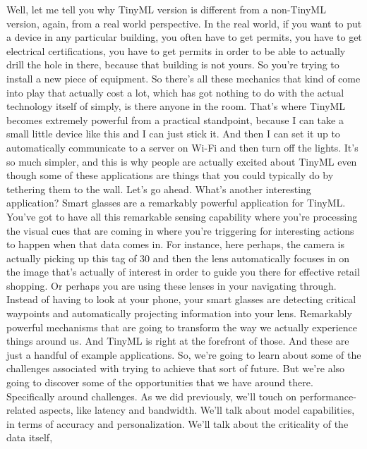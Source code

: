   Well, let me tell you why TinyML version is different from a non-TinyML version,
  again, from a real world perspective.
  In the real world, if you want to put a device in any particular building,
  you often have to get permits, you have to get electrical certifications,
  you have to get permits in order to be able to actually drill
  the hole in there, because that building is not yours.
  So you're trying to install a new piece of equipment.
  So there's all these mechanics that kind of
  come into play that actually cost a lot, which has got nothing
  to do with the actual technology itself of simply, is there anyone in the room.
  That's where TinyML becomes extremely powerful from a practical standpoint,
  because I can take a small little device like this and I can just stick it.
  And then I can set it up to automatically communicate
  to a server on Wi-Fi and then turn off the lights.
  It's so much simpler, and this is why people are actually
  excited about TinyML even though some of these applications
  are things that you could typically do by tethering them to the wall.
  Let's go ahead.
  What's another interesting application?
  Smart glasses are a remarkably powerful application for TinyML.
  You've got to have all this remarkable sensing capability where
  you're processing the visual cues that are coming
  in where you're triggering for interesting actions
  to happen when that data comes in.
  For instance, here perhaps, the camera is actually
  picking up this tag of 30%
  and then the lens automatically focuses in on the image that's
  actually of interest in order to guide you there
  for effective retail shopping.
  Or perhaps you are using these lenses in your navigating through.
  Instead of having to look at your phone, your smart glasses
  are detecting critical waypoints and automatically projecting information
  into your lens.
  Remarkably powerful mechanisms that are going to transform the way we
  actually experience things around us.
  And TinyML is right at the forefront of those.
  And these are just a handful of example applications.
  So, we're going to learn about some of the challenges
  associated with trying to achieve that sort of future.
  But we're also going to discover some of the opportunities
  that we have around there.
  Specifically around challenges.
  As we did previously, we'll touch on performance-related aspects,
  like latency and bandwidth.
  We'll talk about model capabilities, in terms of accuracy and personalization.
  We'll talk about the criticality of the data itself,
